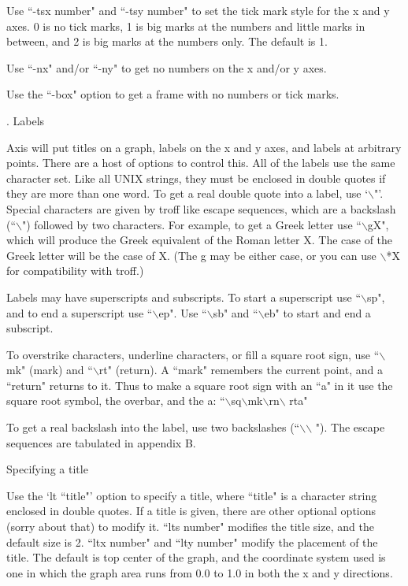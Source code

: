 Use ``-tsx number" and ``-tsy number" to set the tick mark style for the
x and y axes. 0 is no tick marks, 1 is big marks at the numbers and
little marks in between, and 2 is big marks at the numbers only.
The default is 1.

Use ``-nx" and/or ``-ny" to get no numbers on the x and/or y axes.

Use the ``-box" option to get a frame with no numbers or tick marks.

. Labels

\def\bs{$\backslash$}
Axis will put titles on a graph, labels on the x and y axes, and labels
at arbitrary points.  There are a host of options to control this.  All
of the labels use the same character set.  Like all UNIX strings, they
must be enclosed in double quotes if they are more than one word.  To
get a real double quote into a label, use `\bs"'. Special characters are
given by troff like escape sequences, which are a backslash (``\bs")
followed by two characters.  For example, to get a Greek letter use
``\bs gX", which will produce the Greek equivalent of the Roman letter
X.  The case of the Greek letter will be the case of X.  (The g may be
either case, or you can use \bs*X for compatibility with troff.)

Labels may have superscripts and subscripts.  To start a superscript use
``\bs sp", and to end a superscript use ``\bs ep".  Use ``\bs sb" and
``\bs eb" to start and end a subscript.

To overstrike characters, underline characters, or fill a square root
sign, use ``\bs mk" (mark) and ``\bs rt" (return).  A ``mark"
remembers the current point, and a ``return" returns to it.  Thus to make
a square root sign with an ``a" in it use the square root symbol, the
overbar, and the a: ``\bs sq\bs mk\bs rn\bs
rta"

To get a real backslash into the label, use two backslashes (``\bs\bs
"). The escape sequences are tabulated in appendix B.

 Specifying a title

Use the `lt ``title"' option to specify a title, where ``title" is
a character string enclosed in double quotes.  If a title is given,
there are other optional options (sorry about that) to modify it.
``lts number" modifies the title size, and the default size is 2.
``ltx number" and ``lty number" modify the placement of the title.
The default is top center of the graph, and the coordinate system used
is one in which the graph area runs from 0.0 to 1.0 in both the x and
y directions.

